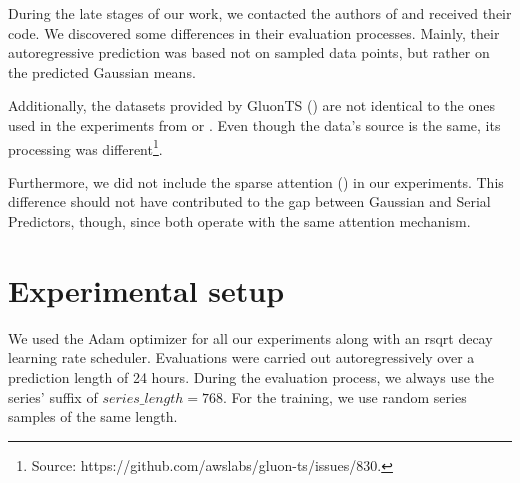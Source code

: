 \documentclass[en]{pracamgr}
\begin{document}
	During the late stages of our work, we contacted the authors of \cite{enhancing} and received their code. We discovered some differences in their evaluation processes. Mainly, their autoregressive prediction was based not on sampled data points, but rather on the predicted Gaussian means.
	
	Additionally, the datasets provided by GluonTS (\cite{gluonts}) are not identical to the ones used in the experiments from \cite{enhancing} or \cite{deepar}. Even though the data's source is the same, its processing was different\footnote{Source: https://github.com/awslabs/gluon-ts/issues/830.}.
	
	Furthermore, we did not include the sparse attention (\cite{enhancing}) in our experiments. 
	This difference should not have contributed to the gap between Gaussian and Serial Predictors, though, since both operate with the same attention mechanism.
	
	
	\section{Experimental setup}
	
	We used the Adam optimizer for all our experiments along with an rsqrt decay learning rate scheduler.
	Evaluations were carried out autoregressively over a prediction length of 24 hours. During the evaluation process, we always use the series' suffix of $series\_length = 768$. For the training, we use random series samples of the same length. 
	
\end{document}
